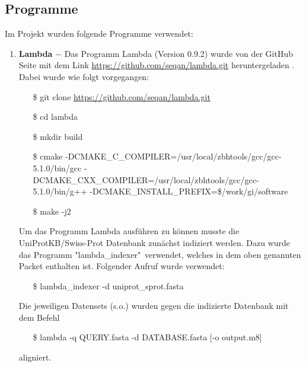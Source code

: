 \documentclass[10pt, a4paper]{report}[08.12.2015]
\begin{document}
      \subsection{Programme}
      \label{subsec:Programme}
        Im Projekt wurden folgende Programme verwendet:
        
        \begin{enumerate}
          
          \item \textbf{Lambda} $-$ Das Programm Lambda (Version 0.9.2) \cite{hauswedell2014} wurde 			  von der GitHub Seite mit dem Link 											  \url{https://github.com/seqan/lambda.git} heruntergeladen 					  . Dabei wurde wie folgt vorgegangen:
          \begin{itemize}
            \item[\$] git clone \url{https://github.com/seqan/lambda.git}
            \item[\$] cd lambda
            \item[\$] mkdir build
            \item[\$] cmake																    -DCMAKE\_C\_COMPILER=/usr/local/zbhtools/gcc/gcc-5.1.0/bin/gcc 
            -DCMAKE\_CXX\_COMPILER=/usr/local/zbhtools/gcc/gcc-5.1.0/bin/g++ 
            -DCMAKE\_INSTALL\_PREFIX=\$/work/gi/software 
            \item[\$] make -j2													   
          \end{itemize}
          Um das Programm Lambda ausf\"uhren zu k\"onnen musste die 					  UniProtKB/Swiss-Prot Datenbank zun\"achst indiziert werden. Dazu 				  wurde das Programm "lambda\_indexer"\ verwendet, welches in dem 				  oben genannten Packet enthalten ist. Folgender Aufruf wurde 					  verwendet:
          \begin{itemize}
            \item[\$] lambda\_indexer -d uniprot\_sprot.fasta
          \end{itemize}
          Die jeweiligen Datensets (s.o.) wurden gegen die indizierte 					  Datenbank mit dem Befehl
          \begin{itemize}
            \item[\$] lambda -q QUERY.fasta -d DATABASE.fasta [-o output.m8]
          \end{itemize}
          aligniert.
          

\end{enumerate}
\end{document}
